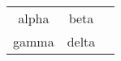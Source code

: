 \begin{table}
\centering
\begin{tabular}{ccc}
\toprule
alpha 	 & beta 	 &  \\
gamma 	 & delta 	 &  \\
\bottomrule
\end{tabular}
\end{table}